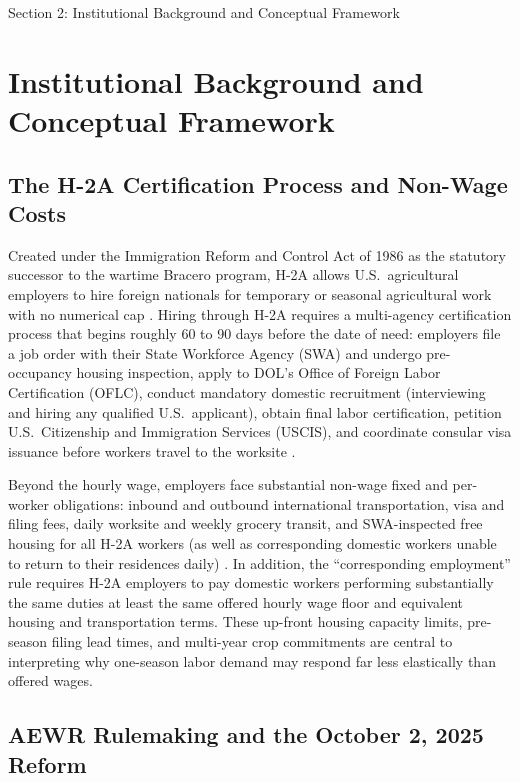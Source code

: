 \FloatBarrier
\begin{llmdraft}{Section 2: Institutional Background and Conceptual Framework}
\section{Institutional Background and Conceptual Framework}
\label{sec:background}

\subsection{The H-2A Certification Process and Non-Wage Costs}

Created under the Immigration Reform and Control Act of 1986 as the statutory
successor to the wartime Bracero program, H-2A allows U.S.\ agricultural
employers to hire foreign nationals for temporary or seasonal agricultural
work with no numerical cap \citep{dol_h2a_info,usda_h2a_checklist}. Hiring
through H-2A requires a multi-agency certification process that begins roughly
60 to 90 days before the date of need: employers file a job order with their
State Workforce Agency (SWA) and undergo pre-occupancy housing inspection,
apply to DOL's Office of Foreign Labor Certification (OFLC), conduct mandatory
domestic recruitment (interviewing and hiring any qualified U.S.\ applicant),
obtain final labor certification, petition U.S.\ Citizenship and Immigration
Services (USCIS), and coordinate consular visa issuance before workers travel
to the worksite \citep{usda_h2a_checklist}.

Beyond the hourly wage, employers face substantial non-wage fixed and
per-worker obligations: inbound and outbound international transportation,
visa and filing fees, daily worksite and weekly grocery transit, and
SWA-inspected free housing for all H-2A workers (as well as corresponding
domestic workers unable to return to their residences daily)
\citep{usda_h2a_info}. In addition, the ``corresponding employment'' rule
requires H-2A employers to pay domestic workers performing substantially the
same duties at least the same offered hourly wage floor and equivalent housing
and transportation terms. These up-front housing capacity limits, pre-season
filing lead times, and multi-year crop commitments are central to interpreting
why one-season labor demand may respond far less elastically than offered
wages.

\subsection{AEWR Rulemaking and the October 2, 2025 Reform}


\end{llmdraft}
